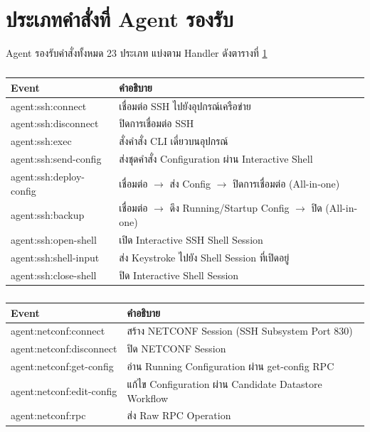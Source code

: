 \section{ประเภทคำสั่งที่ Agent รองรับ}
\hspace*{1.3em}
Agent รองรับคำสั่งทั้งหมด 23 ประเภท แบ่งตาม Handler ดังตารางที่ \ref{tabD2:AgentCommands}

\begin{table}[H]
\centering
\caption{}
\label{tabD2:AgentCommands}
\fontSixTeen
\begin{tabularx}{\textwidth}{|l|X|}
\hline
\textbf{Event} & \textbf{คำอธิบาย} \\
\hline
agent:ssh:connect & เชื่อมต่อ SSH ไปยังอุปกรณ์เครือข่าย \\
\hline
agent:ssh:disconnect & ปิดการเชื่อมต่อ SSH \\
\hline
agent:ssh:exec & สั่งคำสั่ง CLI เดี่ยวบนอุปกรณ์ \\
\hline
agent:ssh:send-config & ส่งชุดคำสั่ง Configuration ผ่าน Interactive Shell \\
\hline
agent:ssh:deploy-config & เชื่อมต่อ $\rightarrow$ ส่ง Config $\rightarrow$ ปิดการเชื่อมต่อ (All-in-one) \\
\hline
agent:ssh:backup & เชื่อมต่อ $\rightarrow$ ดึง Running/Startup Config $\rightarrow$ ปิด (All-in-one) \\
\hline
agent:ssh:open-shell & เปิด Interactive SSH Shell Session \\
\hline
agent:ssh:shell-input & ส่ง Keystroke ไปยัง Shell Session ที่เปิดอยู่ \\
\hline
agent:ssh:close-shell & ปิด Interactive Shell Session \\
\hline
\end{tabularx}
\end{table}

\begin{table}[H]
\centering
\caption{}
\label{tabD2:NetconfCommands}
\fontSixTeen
\begin{tabularx}{\textwidth}{|l|X|}
\hline
\textbf{Event} & \textbf{คำอธิบาย} \\
\hline
agent:netconf:connect & สร้าง NETCONF Session (SSH Subsystem Port 830) \\
\hline
agent:netconf:disconnect & ปิด NETCONF Session \\
\hline
agent:netconf:get-config & อ่าน Running Configuration ผ่าน get-config RPC \\
\hline
agent:netconf:edit-config & แก้ไข Configuration ผ่าน Candidate Datastore Workflow \\
\hline
agent:netconf:rpc & ส่ง Raw RPC Operation \\
\hline
\end{tabularx}
\end{table}

